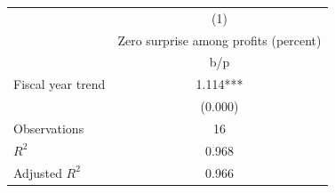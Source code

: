 {
\def\sym#1{\ifmmode^{#1}\else\(^{#1}\)\fi}
\begin{tabular}{l*{1}{c}}
\hline\hline
                    &\multicolumn{1}{c}{(1)}\\
                    &\multicolumn{1}{c}{Zero surprise among profits (percent)}\\
                    &         b/p   \\
\hline
Fiscal year trend   &       1.114***\\
                    &     (0.000)   \\
\hline
Observations        &          16   \\
\(R^{2}\)           &       0.968   \\
Adjusted \(R^{2}\)  &       0.966   \\
\hline\hline
\end{tabular}
}
